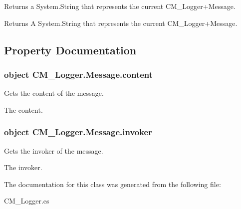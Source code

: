 Returns a System.\+String that represents the current C\+M\+\_\+\+Logger+\+Message. 

\begin{DoxyReturn}{Returns}
A System.\+String that represents the current C\+M\+\_\+\+Logger+\+Message.
\end{DoxyReturn}


\subsection{Property Documentation}
\hypertarget{class_c_m___logger_1_1_message_ac403c59f0f7f9452ad2cc3d7abf22844}{}
\subsubsection[{content}]{\setlength{\rightskip}{0pt plus 5cm}object C\+M\+\_\+\+Logger.\+Message.\+content\hspace{0.3cm}{\ttfamily [get]}}\label{class_c_m___logger_1_1_message_ac403c59f0f7f9452ad2cc3d7abf22844}


Gets the content of the message. 

The content.\hypertarget{class_c_m___logger_1_1_message_ad9921bbcd73048b60d9ba2c3b77286ae}{}
\subsubsection[{invoker}]{\setlength{\rightskip}{0pt plus 5cm}object C\+M\+\_\+\+Logger.\+Message.\+invoker\hspace{0.3cm}{\ttfamily [get]}}\label{class_c_m___logger_1_1_message_ad9921bbcd73048b60d9ba2c3b77286ae}


Gets the invoker of the message. 

The invoker.

The documentation for this class was generated from the following file\+:\begin{DoxyCompactItemize}
\item 
C\+M\+\_\+\+Logger.\+cs\end{DoxyCompactItemize}
